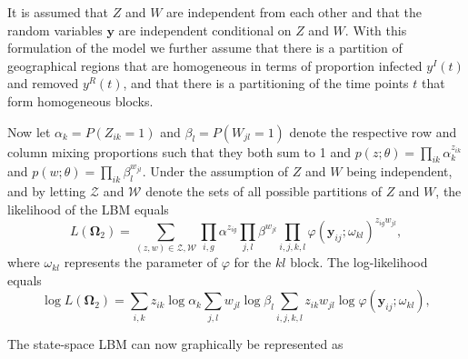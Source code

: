 \documentclass[10pt,a4paper]{article}
\begin{document}
It is assumed that $Z$ and $W$ are independent from each other and that the random variables $\mathbf{y}$ are independent conditional on $Z$ and $W$. With this formulation of the model we further assume that there is a partition of geographical regions that are homogeneous in terms of proportion infected $y^I(t)$ and removed $y^R(t)$, and that there is a partitioning of the time points $t$ that form homogeneous blocks.

Now let $\alpha_k = P(Z_{ik} = 1)$ and $\beta_l = P(W_{jl} = 1)$ denote the respective row and column mixing proportions such that they both sum to 1 and 
%
$
p(z; \theta) = \prod_{ik} \alpha_k^{z_{ik}} 
$
%
and 
%
$
p(w; \theta) = \prod_{ik} \beta_l^{w_{jl}}. 
$ 
%
Under the assumption of $Z$ and $W$ being independent, and by letting $\mathcal{Z}$ and $\mathcal{W}$ denote the sets of all possible partitions of $Z$ and $W$, the likelihood of the LBM equals
$$
L(\boldsymbol{\Omega}_2) = \sum_{(z, w) \in \mathcal{Z}, \mathcal{W}} \prod_{i, g} \alpha^{z_{ig}} \prod_{j, l} \beta^{w_{jl}} \prod_{i, j, k, l} \varphi(\mathbf{y}_{ij}; \omega_{kl})^{z_{ig} w_{jl}},
$$
%
where $\omega_{kl}$ represents the parameter of $\varphi$ for the $kl$ block. The log-likelihood equals 
%
$$
\log L(\boldsymbol{\Omega}_2) = \sum_{i, k} z_{ik} \log\alpha_k \sum_{j, l} w_{jl} \log \beta_l \sum_{i, j, k, l} z_{ik} w_{jl} \log\varphi(\mathbf{y}_{ij}; \omega_{kl}),
$$
%

The state-space LBM can now graphically be represented as

\begin{figure}[H]
	\centering
\end{figure}	
\end{document}
